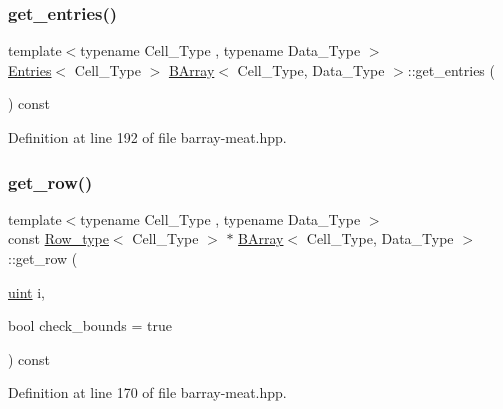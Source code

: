 \subsubsection{\texorpdfstring{get\+\_\+entries()}{get\_entries()}}
{\footnotesize\ttfamily template$<$typename Cell\+\_\+\+Type , typename Data\+\_\+\+Type $>$ \\
\hyperlink{class_entries}{Entries}$<$ Cell\+\_\+\+Type $>$ \hyperlink{class_b_array}{B\+Array}$<$ Cell\+\_\+\+Type, Data\+\_\+\+Type $>$\+::get\+\_\+entries (\begin{DoxyParamCaption}{ }\end{DoxyParamCaption}) const\hspace{0.3cm}{\ttfamily [inline]}}



Definition at line 192 of file barray-\/meat.\+hpp.

\mbox{\label{class_b_array_a2c969ceb1d37eff9ebcac25741de1808}} 
\subsubsection{\texorpdfstring{get\+\_\+row()}{get\_row()}}
{\footnotesize\ttfamily template$<$typename Cell\+\_\+\+Type , typename Data\+\_\+\+Type $>$ \\
const \hyperlink{typedefs_8hpp_a83d6ee40a2ba22844108bb8b82e9b951}{Row\+\_\+type}$<$ Cell\+\_\+\+Type $>$ $\ast$ \hyperlink{class_b_array}{B\+Array}$<$ Cell\+\_\+\+Type, Data\+\_\+\+Type $>$\+::get\+\_\+row (\begin{DoxyParamCaption}\item[{\hyperlink{typedefs_8hpp_a91ad9478d81a7aaf2593e8d9c3d06a14}{uint}}]{i,  }\item[{bool}]{check\+\_\+bounds = {\ttfamily true} }\end{DoxyParamCaption}) const\hspace{0.3cm}{\ttfamily [inline]}}



Definition at line 170 of file barray-\/meat.\+hpp.

\mbox{\label{class_b_array_a098b5214df6790a5b4aaf3e0f7c1473a}} 
